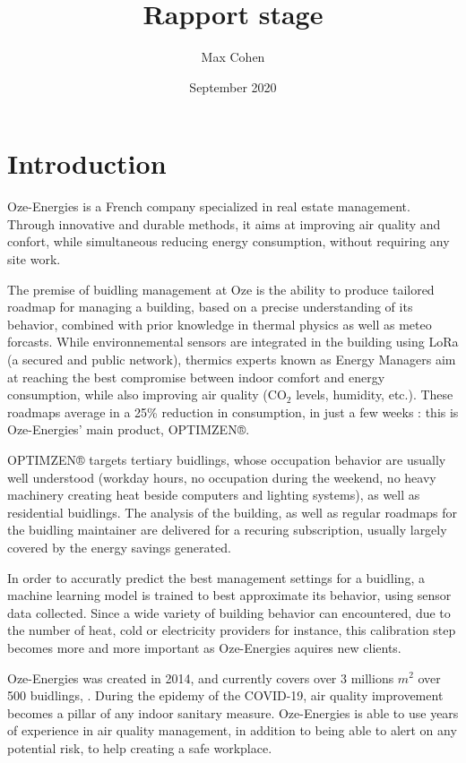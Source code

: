 \documentclass[12pt]{article}
\title{Rapport stage}
\author{Max Cohen}
\date{September 2020}
\begin{document}
\begin{titlepage}
    \maketitle
\end{titlepage}

\section{Introduction}

Oze-Energies is a French company specialized in real estate management. Through innovative and durable methods, it aims at improving air quality and confort, while simultaneous reducing energy consumption, without requiring any site work.

The premise of buidling management at Oze is the ability to produce tailored roadmap for managing a building, based on a precise understanding of its behavior, combined with prior knowledge in thermal physics as well as meteo forcasts. While environnemental sensors are integrated in the building using LoRa (a secured and public network), thermics experts known as Energy Managers aim at reaching the best compromise between indoor comfort and energy consumption, while also improving air quality (\ensuremath{\mathrm{CO_2}} levels, humidity, etc.). These roadmaps average in a 25\% reduction in consumption, in just a few weeks : this is Oze-Energies' main product, OPTIMZEN®.

OPTIMZEN® targets tertiary buidlings, whose occupation behavior are usually well understood (workday hours, no occupation during the weekend, no heavy machinery creating heat beside computers and lighting systems), as well as residential buidlings. The analysis of the building, as well as regular roadmaps for the buidling maintainer are delivered for a recuring subscription, usually largely covered by the energy savings generated.

In order to accuratly predict the best management settings for a buidling, a machine learning model is trained to best approximate its behavior, using sensor data collected. Since a wide variety of building behavior can encountered, due to the number of heat, cold or electricity providers for instance, this calibration step becomes more and more important as Oze-Energies aquires new clients.

Oze-Energies was created in 2014, and currently covers over 3 millions $m^2$ over 500 buidlings, \cite{}. During the epidemy of the COVID-19, air quality improvement becomes a pillar of any indoor sanitary measure. Oze-Energies is able to use years of experience in air quality management, in addition to being able to alert on any potential risk, to help creating a safe workplace.
\end{document}
